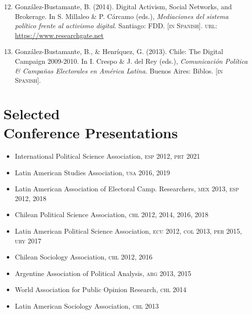 \documentclass[letterpaper,margin]{res}
\newenvironment{benumerate}[1]{
    \let\oldItem\item
    \def\item{\addtocounter{enumi}{-2}\oldItem}
    \begin{enumerate}
    \setcounter{enumi}{#1}
    \addtocounter{enumi}{1}
}{
    \end{enumerate}
}
\begin{document}
\begin{resume}
\begin{benumerate}{11}
\item{\small Gonz\'alez-Bustamante, B. (2014). Digital Activism, Social Networks, and Brokerage. In S. Millaleo \& P. C\'arcamo (eds.), {\itshape Mediaciones del sistema pol\'itico frente al activismo digital}. Santiago: FDD. {\footnotesize \scshape [in Spanish]}. {\scshape url}: \href{https://www.researchgate.net/publication/321992867_Activismo_digital_redes_sociales_e_intermediacion}{https://www.researchgate.net}}\vspace{1mm}


\item{\small Gonz\'alez-Bustamante, B., \& Henr\'iquez, G. (2013). Chile: The Digital Campaign 2009-2010. In I. Crespo \& J. del Rey (eds.), {\itshape Comunicaci\'on Pol\'itica \& Campa\~nas Electorales en Am\'erica Latina}. Buenos Aires: Biblos. {\footnotesize \scshape [in Spanish].}}
\end{benumerate}


\section{\footnotesize Selected \\ Conference Presentations}

\begin{itemize}
\item{\small International Political Science Association, {\scshape esp} 2012, {\scshape prt} 2021}
\item{\small Latin American Studies Association, {\scshape usa} 2016, 2019}
\item{\small Latin American Association of Electoral Camp. Researchers, {\scshape mex} 2013, {\scshape esp} 2012, 2018}
\item{\small Chilean Political Science Association, {\scshape chl} 2012, 2014, 2016, 2018}
\item{\small Latin American Political Science Association, {\scshape ecu} 2012, {\scshape col} 2013, {\scshape per} 2015, {\scshape ury} 2017}
\item{\small Chilean Sociology Association, {\scshape chl} 2012, 2016}
\item{\small Argentine Association of Political Analysis, {\scshape arg} 2013, 2015}
\item{\small World Association for Public Opinion Research, {\scshape chl} 2014}
\item{\small Latin American Sociology Association, {\scshape chl} 2013}
\end{itemize}


\end{resume}
\end{document}
